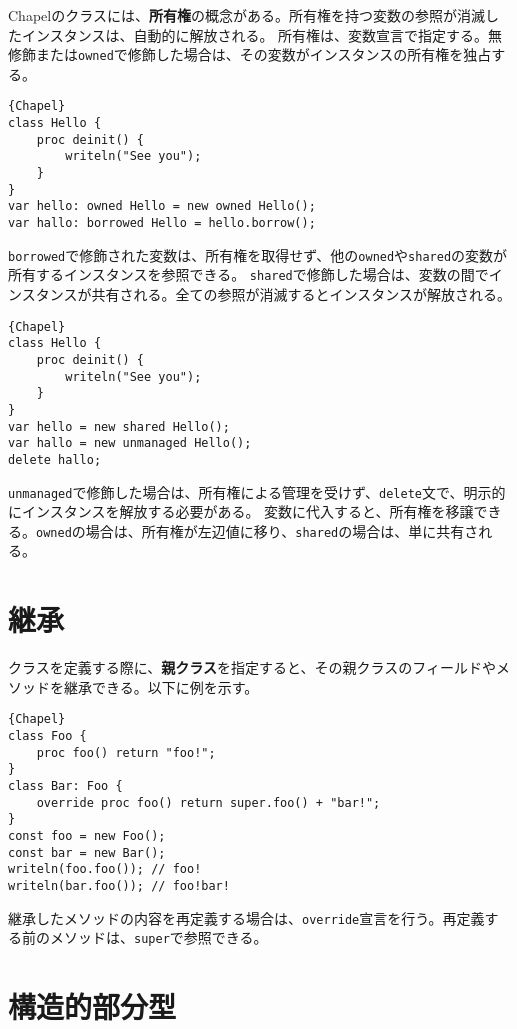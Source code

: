 \documentclass[10pt,a4paper]{book}
\begin{document}
Chapelのクラスには、\textbf{所有権}の概念がある。所有権を持つ変数の参照が消滅したインスタンスは、自動的に解放される。
所有権は、変数宣言で指定する。無修飾または\texttt{owned}で修飾した場合は、その変数がインスタンスの所有権を独占する。

\begin{Verbatim}{Chapel}
class Hello {
	proc deinit() {
		writeln("See you");
	}
}
var hello: owned Hello = new owned Hello();
var hallo: borrowed Hello = hello.borrow();
\end{Verbatim}

\texttt{borrowed}で修飾された変数は、所有権を取得せず、他の\texttt{owned}や\texttt{shared}の変数が所有するインスタンスを参照できる。
\texttt{shared}で修飾した場合は、変数の間でインスタンスが共有される。全ての参照が消滅するとインスタンスが解放される。

\begin{Verbatim}{Chapel}
class Hello {
	proc deinit() {
		writeln("See you");
	}
}
var hello = new shared Hello();
var hallo = new unmanaged Hello();
delete hallo;
\end{Verbatim}

\texttt{unmanaged}で修飾した場合は、所有権による管理を受けず、\texttt{delete}文で、明示的にインスタンスを解放する必要がある。
変数に代入すると、所有権を移譲できる。\texttt{owned}の場合は、所有権が左辺値に移り、\texttt{shared}の場合は、単に共有される。

\section{継承}

クラスを定義する際に、\textbf{親クラス}を指定すると、その親クラスのフィールドやメソッドを継承できる。以下に例を示す。

\begin{Verbatim}{Chapel}
class Foo {
	proc foo() return "foo!";
}
class Bar: Foo {
	override proc foo() return super.foo() + "bar!";
}
const foo = new Foo();
const bar = new Bar();
writeln(foo.foo()); // foo!
writeln(bar.foo()); // foo!bar!
\end{Verbatim}

継承したメソッドの内容を再定義する場合は、\texttt{override}宣言を行う。再定義する前のメソッドは、\texttt{super}で参照できる。

\section{構造的部分型}
\end{document}
